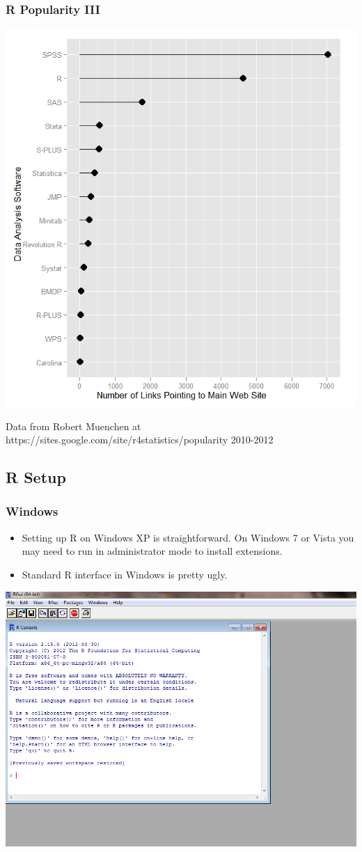 \documentclass{beamer}
\begin{document}
\begin{frame}
\frametitle{R Popularity III}
\vspace{-.1in}
\begin{center}
\includegraphics[height=.78\paperheight]{sitelinks}
\end{center}
\footnotesize Data from Robert Muenchen at https://sites.google.com/site/r4statistics/popularity 2010-2012
\end{frame}

\subsection{R Setup}
\begin{frame}
\frametitle{Windows}
\begin{itemize}
  \item Setting up R on Windows XP is straightforward. On Windows 7 or Vista you may need to run in administrator mode to install extensions.
  \item Standard R interface in Windows is pretty ugly. 
\end{itemize}

\begin{center}
\includegraphics[height=.4\paperheight,width=.6\textwidth]{rgui}
\end{center}
\end{frame}
\end{document}
